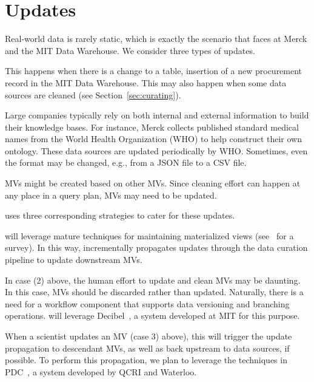 \section{Updates}
\label{sec:updates}

Real-world data is rarely static, which is exactly the scenario that \dcv faces at Merck and the MIT Data Warehouse.  We consider three types of updates.

 This happens when there is a change to a table, \eg insertion of a new procurement record in the MIT Data Warehouse. This may also happen when some data sources are cleaned (see Section~\ref{sec:curating}).


 Large companies typically rely on both internal and external information to build their knowledge bases. For instance, Merck collects published standard medical names from the World Health Organization (WHO) to help construct their own ontology. These data sources are updated periodically by WHO.  Sometimes, even the format may be changed, e.g., from a JSON file to a CSV file.


 MVs might be created based on other MVs.  Since cleaning effort can happen at any place in a query plan, MVs may need to be updated.


\dcv uses three corresponding strategies to cater for these updates.


 \dcv will leverage mature techniques for maintaining materialized views (see~\cite{DBLP:journals/debu/GuptaM95} for a survey).  In this way, \dcv incrementally propagates updates through the data curation pipeline to update downstream MVs.




  In case (2) above, the human effort to update and clean MVs may be daunting. In this case, MVs should be discarded rather than updated. Naturally, there is a need for a workflow component that supports data versioning and branching operations. \dcv will leverage Decibel~\cite{DBLP:journals/pvldb/MaddoxGEMPD16}, a system developed at MIT for this purpose.

 When a scientist updates an MV (case 3) above), this will trigger the update propagation to descendant MVs, as well as back upstream to data sources, if possible. To perform this propagation, we plan to leverage the techniques in PDC~\cite{DBLP:conf/sigmod/ChalamallaIOP14}, a system developed by QCRI and Waterloo.



